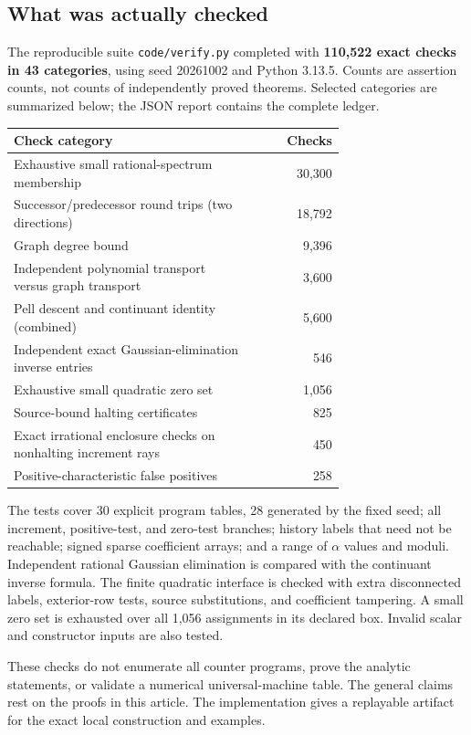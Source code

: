 \documentclass[11pt,letterpaper]{article}
\theoremstyle{definition}
\theoremstyle{remark}
\begin{document}
\subsection{What was actually checked}
The reproducible suite \texttt{code/verify.py} completed with
\textbf{110,522 exact checks in 43 categories}, using seed 20261002 and
Python 3.13.5. Counts are assertion counts, not counts of independently
proved theorems. Selected categories are summarized below; the JSON report
contains the complete ledger.
\begin{center}
\begin{tabular}{p{0.72\linewidth}r}
\toprule
Check category & Checks\\
\midrule
Exhaustive small rational-spectrum membership & 30,300\\
Successor/predecessor round trips (two directions) & 18,792\\
Graph degree bound & 9,396\\
Independent polynomial transport versus graph transport & 3,600\\
Pell descent and continuant identity (combined) & 5,600\\
Independent exact Gaussian-elimination inverse entries & 546\\
Exhaustive small quadratic zero set & 1,056\\
Source-bound halting certificates & 825\\
Exact irrational enclosure checks on nonhalting increment rays & 450\\
Positive-characteristic false positives & 258\\
\bottomrule
\end{tabular}
\end{center}

The tests cover 30 explicit program tables, 28 generated by the fixed seed;
all increment, positive-test, and zero-test branches; history labels that
need not be reachable; signed sparse coefficient arrays; and a range of
$\alpha$ values and moduli. Independent rational Gaussian elimination is
compared with the continuant inverse formula. The finite quadratic
interface is checked with extra disconnected labels, exterior-row tests,
source substitutions, and coefficient tampering. A small zero set is
exhausted over all 1,056 assignments in its declared box. Invalid scalar
and constructor inputs are also tested.

These checks do not enumerate all counter programs, prove the analytic
statements, or validate a numerical universal-machine table. The general
claims rest on the proofs in this article. The implementation gives a
replayable artifact for the exact local construction and examples.
\end{document}
